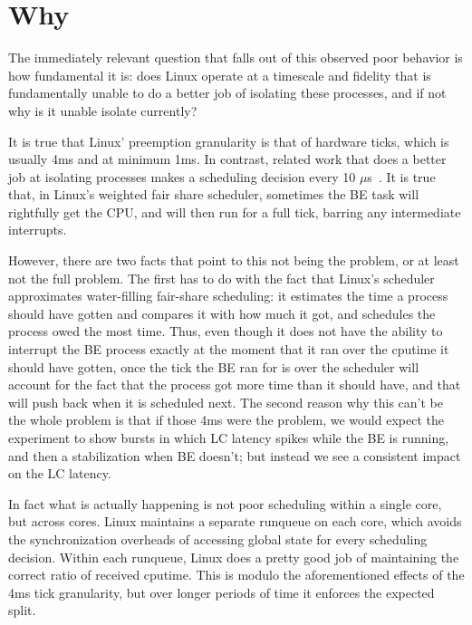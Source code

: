 
\chapter{Why}


The immediately relevant question that falls out of this observed poor behavior
is how fundamental it is: does Linux operate at a timescale and fidelity that is
fundamentally unable to do a better job of isolating these processes, and if not
why is it unable isolate currently?

It is true that Linux' preemption granularity is that of hardware ticks, which
is usually 4ms and at minimum 1ms. In contrast, related work that does a better
job at isolating processes makes a scheduling decision every 10
$\mu$s~\cite{caladan}. It is true that, in Linux's weighted fair share
scheduler, sometimes the BE task will rightfully get the CPU, and will then run
for a full tick, barring any intermediate interrupts.

However, there are two facts that point to this not being the problem, or at
least not the full problem. The first has to do with the fact that Linux's
scheduler approximates water-filling fair-share scheduling: it estimates the
time a process should have gotten and compares it with how much it got, and
schedules the process owed the most time. Thus, even though it does not have the
ability to interrupt the BE process exactly at the moment that it ran over the
cputime it should have gotten, once the tick the BE ran for is over the
scheduler will account for the fact that the process got more time than it
should have, and that will push back when it is scheduled next. The second reason why this can't be the whole
problem is that if those 4ms were the problem, we would expect the experiment to
show bursts in which LC latency spikes while the BE is running, and then a
stabilization when BE doesn't; but instead we see a consistent impact on the LC
latency.


In fact what is actually happening is not poor scheduling within a single core,
but across cores. Linux maintains a separate runqueue on each core, which avoids
the synchronization overheads of accessing global state for every scheduling
decision. Within each runqueue, Linux does a pretty good job of maintaining the
correct ratio of received cputime. This is modulo the aforementioned effects of
the 4ms tick granularity, but over longer periods of time it enforces the
expected split.

